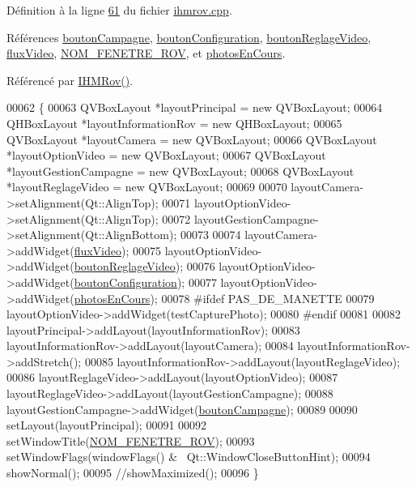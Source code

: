 Définition à la ligne \hyperlink{ihmrov_8cpp_source_l00061}{61} du fichier \hyperlink{ihmrov_8cpp_source}{ihmrov.\+cpp}.



Références \hyperlink{ihmrov_8h_source_l00057}{bouton\+Campagne}, \hyperlink{ihmrov_8h_source_l00058}{bouton\+Configuration}, \hyperlink{ihmrov_8h_source_l00052}{bouton\+Reglage\+Video}, \hyperlink{ihmrov_8h_source_l00050}{flux\+Video}, \hyperlink{ihmrov_8h_source_l00020}{N\+O\+M\+\_\+\+F\+E\+N\+E\+T\+R\+E\+\_\+\+R\+OV}, et \hyperlink{ihmrov_8h_source_l00051}{photos\+En\+Cours}.



Référencé par \hyperlink{ihmrov_8cpp_source_l00015}{I\+H\+M\+Rov()}.


\begin{DoxyCode}
00062 \{
00063     QVBoxLayout *layoutPrincipal = \textcolor{keyword}{new} QVBoxLayout;
00064     QHBoxLayout *layoutInformationRov = \textcolor{keyword}{new} QHBoxLayout;
00065     QVBoxLayout *layoutCamera = \textcolor{keyword}{new} QVBoxLayout;
00066     QVBoxLayout *layoutOptionVideo = \textcolor{keyword}{new} QVBoxLayout;
00067     QVBoxLayout *layoutGestionCampagne = \textcolor{keyword}{new} QVBoxLayout;
00068     QVBoxLayout *layoutReglageVideo = \textcolor{keyword}{new} QVBoxLayout;
00069 
00070     layoutCamera->setAlignment(Qt::AlignTop);
00071     layoutOptionVideo->setAlignment(Qt::AlignTop);
00072     layoutGestionCampagne->setAlignment(Qt::AlignBottom);
00073 
00074     layoutCamera->addWidget(\hyperlink{class_i_h_m_rov_acdeabe02e1431b5c1817cb2a89debd0a}{fluxVideo});
00075     layoutOptionVideo->addWidget(\hyperlink{class_i_h_m_rov_a57cb3bea4f1f9149d730ccc5688581fc}{boutonReglageVideo});
00076     layoutOptionVideo->addWidget(\hyperlink{class_i_h_m_rov_aea67721180bf155892a297b3c39309c5}{boutonConfiguration});
00077     layoutOptionVideo->addWidget(\hyperlink{class_i_h_m_rov_a0896dea1a2d901a7cf43a344e22fc66d}{photosEnCours});
00078 \textcolor{preprocessor}{    #ifdef PAS\_DE\_MANETTE}
00079     layoutOptionVideo->addWidget(testCapturePhoto);
00080 \textcolor{preprocessor}{    #endif}
00081 
00082     layoutPrincipal->addLayout(layoutInformationRov);
00083     layoutInformationRov->addLayout(layoutCamera);
00084     layoutInformationRov->addStretch();
00085     layoutInformationRov->addLayout(layoutReglageVideo);
00086     layoutReglageVideo->addLayout(layoutOptionVideo);
00087     layoutReglageVideo->addLayout(layoutGestionCampagne);
00088     layoutGestionCampagne->addWidget(\hyperlink{class_i_h_m_rov_a324be23537f48127c49b943aa439a978}{boutonCampagne});
00089 
00090     setLayout(layoutPrincipal);
00091 
00092     setWindowTitle(\hyperlink{ihmrov_8h_aa7e4fcf0d5f67b5c84de425d1f4776ea}{NOM\_FENETRE\_ROV});
00093     setWindowFlags(windowFlags() & ~Qt::WindowCloseButtonHint);
00094     showNormal();
00095     \textcolor{comment}{//showMaximized();}
00096 \}
\end{DoxyCode}
\mbox{\label{class_i_h_m_rov_a77d08efdfc3292d215af4df0e1af33a8}} 
